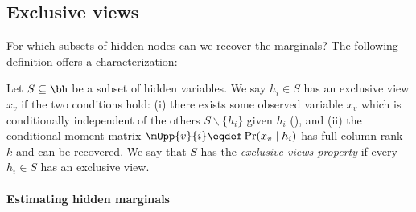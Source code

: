 \subsection{Exclusive views}
\label{sec:general}

For which subsets of hidden nodes can we recover the marginals?  The following
definition offers a characterization:
\begin{definition}
  \label{def:exclusive-views}
Let $S \subseteq \bh$ be a subset of hidden variables.
We say $h_i \in S$ has an exclusive view $x_v$
  if the two conditions hold:
  (i) there exists some observed variable
  $x_{v}$ which is conditionally independent of the others $S \backslash \{ h_i \}$ given $h_i$ (),
  and (ii) the conditional moment matrix $\mOpp{v}{i} \eqdef
  \Pr(x_{v} \mid h_i)$ has full column rank $k$ and can be recovered.
We say that $S$ has the \emph{exclusive views property} if every $h_i \in S$ has an exclusive view.
\end{definition}

\paragraph{Estimating hidden marginals}

